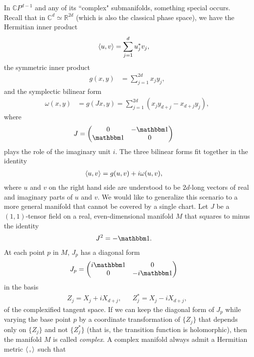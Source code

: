 In $\mathbb{C}P^{d-1}$ and any of its ``complex" submanifolds, something special occurs. Recall that in $\mathbb{C}^d \simeq \mathbb{R}^{2d}$ (which is also the classical phase space), we have the Hermitian inner product
\begin{align}
	\braket{u,v} &= \sum_{j=1}^d u_j^* v_j,
\end{align}
the symmetric inner product
\begin{align}
	g(x,y) &= \sum_{j=1}^{2d} x_j y_j,
\end{align}
and the symplectic bilinear form
\begin{align}
	\omega(x,y) &= g(Jx, y) = \sum_{j=1}^{2d} \left( x_j y_{d+j} - x_{d+j} y_j \right),
\end{align}
where
\begin{align}\label{ch3:eq:almost-complex-structure}
	J &= \begin{pmatrix}
	{\huge 0} & -\id \\
	\id & {\huge 0}
	\end{pmatrix}
\end{align}
plays the role of the imaginary unit $i$. The three bilinear forms fit together in the identity
\begin{align}
	\braket{u,v} &= g(u,v) + i\omega(u,v),
\end{align}
where $u$ and $v$ on the right hand side are understood to be $2d$-long vectors of real and imaginary parts of $u$ and $v$. We would like to generalize this scenario to a more general manifold that cannot be covered by a single chart. Let $J$ be a $(1,1)$-tensor field on a real, even-dimensional manifold $M$ that squares to minus the identity
\begin{align}
	J^2 &= -\id.
\end{align}
At each point $p$ in $M$, $J_p$ has a diagonal form
\begin{align}
	J_p &= \begin{pmatrix}
		i\id & {\huge 0} \\
		{\huge 0} & -i\id
		\end{pmatrix}
\end{align}
in the basis
\begin{align}
	Z_j = X_j + iX_{d+j}, &&
	Z^*_j = X_j - iX_{d+j},
\end{align}
of the complexified tangent space.
If we can keep the diagonal form of $J_p$ while varying the base point $p$ by a coordinate transformation of $\{Z_j\}$ that depends only on $\{Z_j\}$ and not $\{Z^*_j\}$ (that is, the transition function is holomorphic), then the manifold $M$ is called \emph{complex}. A complex manifold always admit a Hermitian metric $\braket{\, ,\,}$ such that
